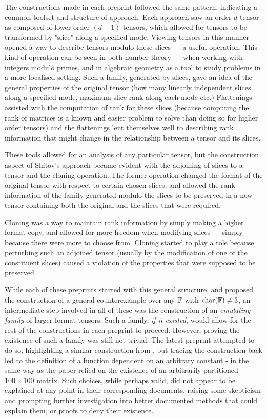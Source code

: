 \documentclass[../Lael_John_MasterThesis_Draft.tex]{subfiles}
\begin{document}
The constructions made in each preprint followed the same pattern, indicating a common toolset and structure of approach. Each approach saw an order-$d$ tensor as composed of lower order-$(d-1)$ tensors, which allowed for tensors to be transformed by "slice" along a specified mode. Viewing tensors in this manner opened a way to describe tensors modulo these slices --- a useful operation. This kind of operation can be seen in both number theory --- when working with integers modulo primes, and in algebraic geometry as a tool to study problems in a more localised setting. Such a family, generated by slices, gave an idea of the general properties of the original tensor (how many linearly independent slices along a specified mode, maximum slice rank along each mode etc.) Flattenings assisted with the computation of rank for these slices (because computing the rank of matrices is a known and easier problem to solve than doing so for higher order tensors) and the flattenings lent themselves well to describing rank information that might change in the relationship between a tensor and its slices.

These tools allowed for an analysis of any particular tensor, but the construction aspect of Shitov's approach became evident with the adjoining of slices to a tensor and the cloning operation. The former operation changed the format of the original tensor with respect to certain chosen slices, and allowed the rank information of the family generated modulo the slices to be preserved in a new tensor containing both the original and the slices that were required.

Cloning was a way to maintain rank information by simply making a higher format copy, and allowed for more freedom when modifying slices --- simply because there were more to choose from. Cloning started to play a role because perturbing such an adjoined tensor (usually by the modification of one of the constituent slices) caused a violation of the properties that were supposed to be preserved. 

While each of these preprints started with this general structure, and \cite{shitov_higher_2024-1} proposed the construction of a general counterexample over any $\mathbb{F}$ with $\text{char}(\mathbb{F}) \neq 3$, an intermediate step involved in all of these was the construction of an \textit{emulating family} of larger-format tensors. Such a family, \textit{if it existed}, would allow for the rest of the constructions in each preprint to proceed. However, proving the existence of such a family was still not trivial. The latest preprint attempted to do so, highlighting a similar construction from \cite{shitov_higher_2024}, but tracing the construction back led to the definition of a function dependent on an arbitrary constant - in the same way as the paper \cite{shitov_counterexample_2018} relied on the existence of an arbitrarily partitioned $100 \times 100$ matrix. Such choices, while perhaps valid, did not appear to be explained at any point in their corresponding documents, raising some skepticism and prompting further investigation into better documented methods that could explain them, or proofs to deny their existence. 
\end{document}
